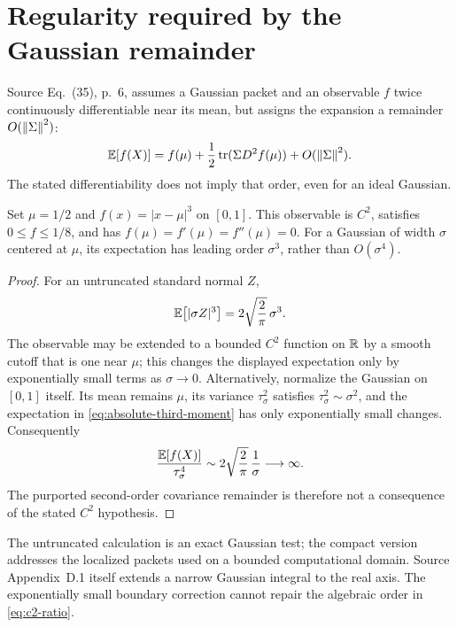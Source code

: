 \section{Regularity required by the Gaussian remainder}
\label{sec:regularity}

Source Eq.~(35), p.~6, assumes a Gaussian packet and an
observable $f$ twice continuously differentiable near its mean, but
assigns the expansion a remainder $O(\left\lVert \Sigma\right\rVert^2)$:
\begin{equation}
 \mathbb E\!\left[f(X)\right]=f(\mu)+\frac12\operatorname{tr}
              (\Sigma D^2f(\mu))+O(\left\lVert \Sigma\right\rVert^2).
 \label{eq:source-observable-remainder}
\end{equation}
The stated differentiability does not imply that order, even for an
ideal Gaussian.

\begin{proposition}[A $C^2$ counterexample]
\label{prop:c2-remainder}
Set $\mu=1/2$ and $f(x)=|x-\mu|^3$ on $[0,1]$.
This observable is $C^2$, satisfies $0\leq f\leq1/8$, and has
$f(\mu)=f'(\mu)=f''(\mu)=0$. For a Gaussian of width $\sigma$ centered
at $\mu$, its expectation has leading order $\sigma^3$, rather than
$O(\sigma^4)$.
\end{proposition}

\begin{proof}
For an untruncated standard normal $Z$,
\begin{equation}
 \mathbb E\!\left[|\sigma Z|^3\right]=2\sqrt{\frac2\pi}\,\sigma^3.
 \label{eq:absolute-third-moment}
\end{equation}
The observable may be extended to a bounded $C^2$ function on $\mathbb R$
by a smooth cutoff that is one near $\mu$; this changes the displayed
expectation only by exponentially small terms as $\sigma\to0$.
Alternatively, normalize the Gaussian on $[0,1]$ itself. Its mean remains
$\mu$, its variance $\tau_\sigma^2$ satisfies
$\tau_\sigma^2\sim\sigma^2$, and the expectation in
\eqref{eq:absolute-third-moment} has only exponentially small changes.
Consequently
\begin{equation}
 \frac{\mathbb E\!\left[f(X)\right]}{\tau_\sigma^4}
 \sim 2\sqrt{\frac2\pi}\,\frac1\sigma\longrightarrow\infty.
 \label{eq:c2-ratio}
\end{equation}
The purported second-order covariance remainder is therefore not a
consequence of the stated $C^2$ hypothesis.
\end{proof}

The untruncated calculation is an exact Gaussian test; the compact
version addresses the localized packets used on a bounded computational
domain. Source Appendix~D.1 itself extends a narrow Gaussian integral
to the real axis. The exponentially small boundary correction cannot
repair the algebraic order in \eqref{eq:c2-ratio}.

